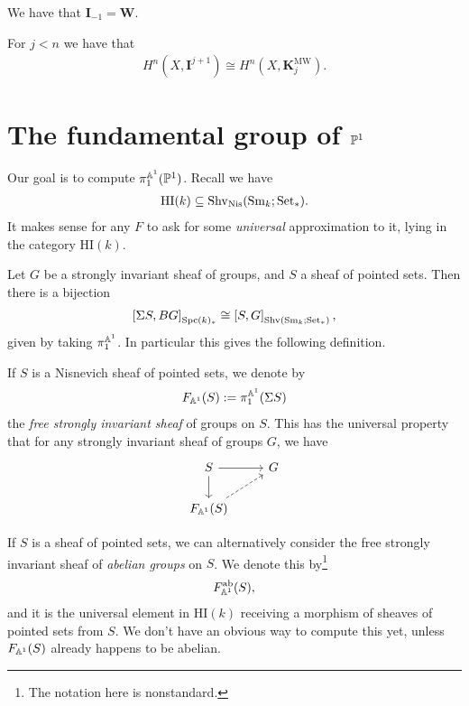 \documentclass[11pt,openany]{book}
\providecommand{\HI}{\mathrm{HI}}
\providecommand{\KMW}{\mathbf{K}^\mathrm{MW}}
\begin{document}
\begin{corollary} We have that $\mathbf{I}_{-1} = \mathbf{W}$.
\end{corollary}


\begin{corollary} For $j<n$ we have that
\begin{align*}
    H^n(X, \mathbf{I}^{j+1}) \cong H^n(X, \KMW_j).
\end{align*}
\end{corollary}



\section{The fundamental group of \texorpdfstring{$\P^1$}{P\^{}1}}

Our goal is to compute $\pi_1^{\A^1}(\P^1)$. Recall we have
\begin{align*}
    \HI(k) \subseteq \Shv_\Nis(\Sm_k;\Set_\ast).
\end{align*}
It makes sense for any $F$ to ask for some \textit{universal} approximation to it, lying in the category $\HI(k)$.

Let $G$ be a strongly invariant sheaf of groups, and $S$ a sheaf of pointed sets. Then there is a bijection
\begin{align*}
    \left[ \Sigma S, BG \right]_{\Spc(k)_\ast} \cong \left[ S, G \right]_{\Shv(\Sm_k;\Set_\ast)},
\end{align*}
given by taking $\pi_1^{\A^1}$. In particular this gives the following definition.

\begin{definition} \cite[7.23]{Morel} If $S$ is a Nisnevich sheaf of pointed sets, we denote by
\begin{align*}
    F_{\A^1}(S) := \pi_1^{\A^1}(\Sigma S)
\end{align*}
the \textit{free strongly invariant sheaf} of groups on $S$. This has the universal property that for any strongly invariant sheaf of groups $G$, we have
\[\begin{tikzcd}
    S\rar\dar & G\\
    F_{\A^1}(S)\ar[ur,dashed] & 
\end{tikzcd} \]
\end{definition}

\begin{definition} If $S$ is a sheaf of pointed sets, we can alternatively consider the free strongly invariant sheaf of \textit{abelian groups} on $S$. We denote this by\footnote{%
The notation here is nonstandard.}
\begin{align*}
    F_{\A^1}^\ab(S),
\end{align*}
and it is the universal element in $\HI(k)$ receiving a morphism of sheaves of pointed sets from $S$. We don't have an obvious way to compute this yet, unless $F_{\A^1}(S)$ already happens to be abelian.
\end{definition}
\end{document}
